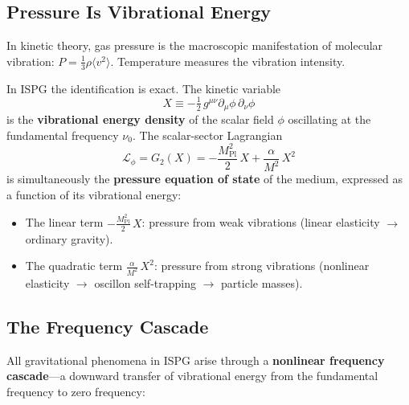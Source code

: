 \documentclass[11pt]{article}
\begin{document}
\subsection{Pressure Is Vibrational Energy}
\label{sec:pressure_vibration}

In kinetic theory, gas pressure is the macroscopic
manifestation of molecular vibration:
$P = \frac{1}{3}\rho\langle v^2\rangle$.
Temperature measures the vibration intensity.

In ISPG the identification is exact. The kinetic
variable
\begin{equation}
  X \equiv -\tfrac{1}{2}\,g^{\mu\nu}
  \partial_\mu\phi\,\partial_\nu\phi
\end{equation}
is the \textbf{vibrational energy density} of the
scalar field $\phi$ oscillating at the fundamental
frequency $\nu_0$. The scalar-sector Lagrangian
\begin{equation}
  \mathcal{L}_\phi = G_2(X)
  = -\frac{M_{\mathrm{Pl}}^2}{2}\,X
  + \frac{\alpha}{M^2}\,X^2
  \label{eq:pressure_is_G2}
\end{equation}
is simultaneously the \textbf{pressure equation of state}
of the medium, expressed as a function of its vibrational
energy:
\begin{itemize}
  \item The linear term
    $-\frac{M_{\mathrm{Pl}}^2}{2}\,X$:
    pressure from weak vibrations
    (linear elasticity $\to$ ordinary gravity).
  \item The quadratic term
    $\frac{\alpha}{M^2}\,X^2$:
    pressure from strong vibrations
    (nonlinear elasticity $\to$ oscillon
    self-trapping $\to$ particle masses).
\end{itemize}

\noindent
\begin{center}
\end{center}

\subsection{The Frequency Cascade}
\label{sec:cascade}

All gravitational phenomena in ISPG arise through a
\textbf{nonlinear frequency cascade}---a downward
transfer of vibrational energy from the fundamental
frequency to zero frequency:
\end{document}
